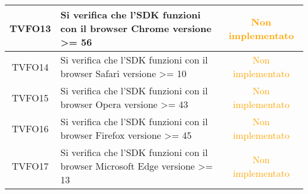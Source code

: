 \begin{center}
\begin{longtable}{|c|>{\centering}m{10cm}|c|}
		TVFO13 & Si verifica che l'SDK funzioni con il browser Chrome versione >= 56 & \textcolor{Orange}{Non implementato}\\ \hline
		TVFO14 & Si verifica che l'SDK funzioni con il browser Safari versione >= 10 & \textcolor{Orange}{Non implementato}\\ \hline
		TVFO15 & Si verifica che l'SDK funzioni con il browser Opera versione >= 43 & \textcolor{Orange}{Non implementato}\\ \hline
		TVFO16 & Si verifica che l'SDK funzioni con il browser Firefox versione >= 45 & \textcolor{Orange}{Non implementato}\\ \hline
		TVFO17 & Si verifica che l'SDK funzioni con il browser Microsoft Edge versione >= 13 & \textcolor{Orange}{Non implementato}\\ \hline
	\end{longtable}
\end{center}
